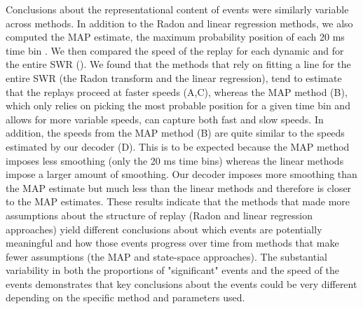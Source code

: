 \documentclass[9pt,lineno]{elife}
\begin{document}
Conclusions about the representational content of events were similarly variable across methods. In addition to the Radon and linear regression methods, we also computed  the MAP estimate, the maximum probability position of each 20 ms time bin \citep{PfeifferAutoassociativedynamicsgeneration2015, StellaHippocampalReactivationRandom2019, KaeferReplayBehavioralSequences2020}. We then compared the speed of the replay for each dynamic and for the entire SWR (). We found that the methods that rely on fitting a line for the entire SWR (the Radon transform and the linear regression), tend to estimate that the replays proceed at faster speeds (A,C), whereas the MAP method (B), which only relies on picking the most probable position for a given time bin and allows for more variable speeds, can capture both fast and slow speeds. In addition, the speeds from the MAP method (B) are quite similar to the speeds estimated by our decoder (D). This is to be expected because the MAP method imposes less smoothing (only the 20 ms time bins) whereas the linear methods impose a larger amount of smoothing. Our decoder imposes more smoothing than the MAP estimate but much less than the linear methods and therefore is closer to the MAP estimates. These results indicate that the methods that made more assumptions about the structure of replay (Radon and linear regression approaches) yield different conclusions about which events are potentially meaningful and how those events progress over time from methods that make fewer assumptions (the MAP and state-space approaches). The substantial variability in both the proportions of "significant" events and the speed of the events demonstrates that key conclusions about the events could be very different depending on the specific method and parameters used. 
\end{document}

